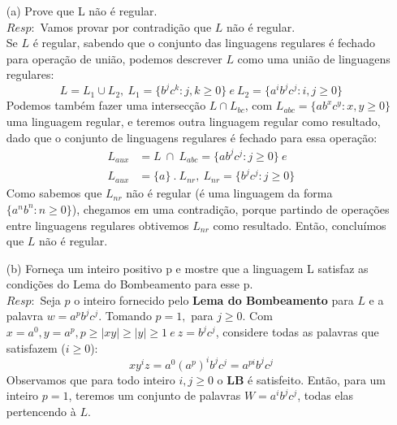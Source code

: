 \documentclass{homework}
\begin{document}
	\begin{itemize}
		\item[(a)] Prove que L não é regular.\\
		$Resp:$ Vamos provar por contradição que $L$ não é regular.\\
			Se $L$ é regular, sabendo que o conjunto das linguagens regulares é fechado para operação de união, podemos descrever $L$ como uma união de linguagens regulares: 
			\[L = L_1 \cup L_2,\ L_1 = \{b^j c^k:j,k \geq 0\}\ e\ L_2 = \{a^i b^j c^j:i,j \geq 0\}\] 
			Podemos também fazer uma intersecção $L \cap L_{bc}$, com $L_{abc} = \{ab^x c^y:x,y \geq 0\}$ uma linguagem regular, e teremos outra linguagem regular como resultado, dado que o conjunto de linguagens regulares é fechado para essa operação:
			\begin{align*}
				L_{aux} &= L\ \cap\ L_{abc} = \{ab^j c^j:j \geq 0\}\ e\\
				L_{aux} &= \{a\}\ .\ L_{nr},\ L_{nr} = \{b^j c^j:j \geq 0\}
			\end{align*}
			Como sabemos que $L_{nr}$ não é regular (é uma linguagem da forma $\{a^nb^n:n \geq 0\}$), chegamos em uma contradição, porque partindo de operações entre linguagens regulares obtivemos $L_{nr}$ como resultado. Então, concluímos que $L$ não é regular.
	\end{itemize}
	\begin{itemize}
		\item[(b)] Forneça um inteiro positivo p e mostre que a linguagem L satisfaz
as condições do Lema do Bombeamento para esse p.\\
		$Resp:$ Seja $p$ o inteiro fornecido pelo \textbf{Lema do Bombeamento} para $L$ e a palavra $w = a^pb^jc^j$. Tomando $p = 1,$ para $j \geq 0$. Com $x = a^0, y = a^p, p \geq |xy| \geq |y| \geq 1\ e\ z = b^j c^j$, considere todas as palavras que satisfazem ($i \geq 0$):
			\[xy^iz = a^0(a^{p})^i b^j c^j = a^{pi} b^j c^j\]
		Observamos que para todo inteiro $i,j \geq 0$ o \textbf{LB} é satisfeito. Então, para um inteiro $p = 1$, teremos um conjunto de palavras $W = a^{i} b^j c^j$, todas elas pertencendo à $L$.
	\end{itemize}
\end{document}
